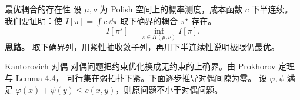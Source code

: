 \documentclass[aspectratio=169]{beamer}
\begin{document}
\begin{frame}{最优耦合的存在性}
  设 $\mu,\nu$ 为 Polish 空间上的概率测度，成本函数 $c$ 下半连续。
  我们要证明：使 $I[\pi]=\int c\,\dd\pi$ 取下确界的耦合 $\pi^\star$ 存在。
  \[
    I[\pi^\star] = \inf_{\pi\in\Pi(\mu,\nu)} I[\pi].
  \]
  \textbf{思路。} 取下确界列，用紧性抽收敛子列，再用下半连续性说明极限仍最优。
\end{frame}

\begin{frame}{Kantorovich 对偶}
  对偶问题把约束优化换成无约束的上确界。由 Prokhorov 定理与 Lemma 4.4，
  可行集在弱拓扑下紧。下面逐步推导对偶间隙为零。
  设 $\varphi,\psi$ 满足 $\varphi(x)+\psi(y)\le c(x,y)$，则原问题不小于对偶问题。
\end{frame}
\end{document}

